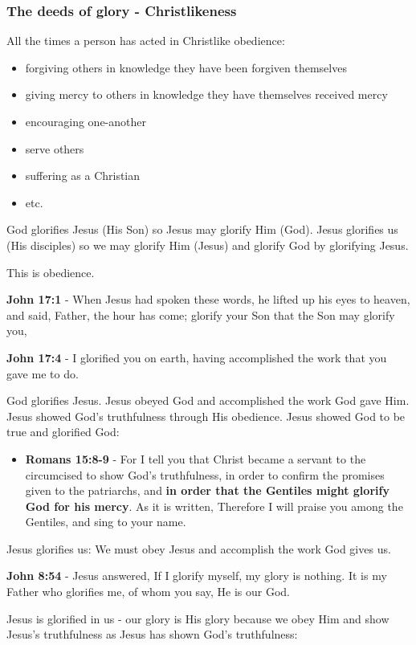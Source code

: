 \documentclass[11pt]{article}
\begin{document}
\subsubsection{The deeds of glory - Christlikeness}
\label{sec:org21faf31}
All the times a person has acted in Christlike obedience:
\begin{itemize}
\item forgiving others in knowledge they have been forgiven themselves
\item giving mercy to others in knowledge they have themselves received mercy
\item encouraging one-another
\item serve others
\item suffering as a Christian
\item etc.
\end{itemize}

God glorifies Jesus (His Son) so Jesus may glorify Him (God).
Jesus glorifies us (His disciples) so we may glorify Him (Jesus) and glorify God by glorifying Jesus.

This is obedience.

\textbf{John 17:1} - When Jesus had spoken these words, he lifted up his eyes to heaven, and said, Father, the hour has come; glorify your Son that the Son may glorify you,

\textbf{John 17:4} - I glorified you on earth, having accomplished the work that you gave me to do.

God glorifies Jesus.
Jesus obeyed God and accomplished the work God gave Him.
Jesus showed God's truthfulness through His obedience. Jesus showed God to be true and glorified God:
\begin{itemize}
\item \textbf{Romans 15:8-9} - For I tell you that Christ became a servant to the circumcised to show God's truthfulness, in order to confirm the promises given to the patriarchs, and \textbf{in order that the Gentiles might glorify God for his mercy}. As it is written, Therefore I will praise you among the Gentiles, and sing to your name.
\end{itemize}

Jesus glorifies us:
We must obey Jesus and accomplish the work God gives us.

\textbf{John 8:54} - Jesus answered, If I glorify myself, my glory is nothing. It is my Father who glorifies me, of whom you say, He is our God.

Jesus is glorified in us - our glory is His glory because we obey Him and show Jesus's truthfulness as Jesus has shown God's truthfulness:
\end{document}
